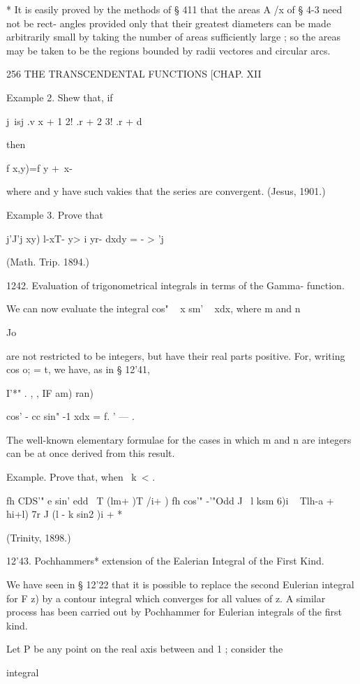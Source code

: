 * It is easily proved by the methods of § 411 that the areas A /x of §
4-3 need not be rect- angles provided only that their greatest
diameters can be made arbitrarily small by taking the number of areas
sufficiently large ; so the areas may be taken to be the regions
bounded by radii vectores and circular arcs.



256 THE TRANSCENDENTAL FUNCTIONS [CHAP. XII

Example 2. Shew that, if

j\ isj .v x + 1 2! .r + 2 3! .r + d

then

f x,y)=f y + \,x-\ \

where and y have such vakies that the series are convergent. (Jesus,
1901.)

Example 3. Prove that

j'J'j xy) l-xT- y> i yr- dxdy = - > 'j

(Math. Trip. 1894.)

1242. Evaluation of trigonometrical integrals in terms of the Gamma-
function.

We can now evaluate the integral cos" ~ x sm' ~ xdx, where m and n

Jo

are not restricted to be integers, but have their real parts positive.
For, writing cos o; = t, we have, as in § 12'41,

I'*" . , , IF am) ran)

cos' - cc sin" -1 xdx = f. ' — .

The well-known elementary formulae for the cases in which m and n are
integers can be at once derived from this result.

Example. Prove that, when \ k\ < .\,

fh CDS'" e sin' edd \ T (lm+ )T /i+ ) fh cos'" -'"Odd J \ l ksm 6)i ~
Tlh-a + hi+l) 7r J (l - k sin2 )i + *

(Trinity, 1898.)

12'43. Pochhammers* extension of the Ealerian Integral of the First
Kind.

We have seen in § 12'22 that it is possible to replace the second
Eulerian integral for F z) by a contour integral which converges for
all values of z. A similar process has been carried out by Pochhammer
for Eulerian integrals of the first kind.

Let P be any point on the real axis between and 1 ; consider the

integral

